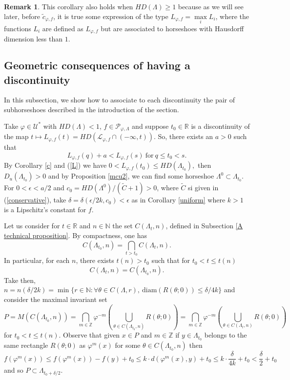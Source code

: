 \documentclass[12pt]{amsart}
\newcommand{\infinity}{\infty}
\theoremstyle{plain} %
\theoremstyle{definition} %
\newtheorem{remark}[theorem]{Remark}
\numberwithin{equation}{section}
\begin{document}
\begin{remark}\label{rr}
This corollary also holds when $HD(\Lambda)\geq 1$ because as we will see later, before $\tilde{c}_{\varphi,f}$, it is true some expression of the type $L_{\varphi, f}=\max\limits_{i}L_i$, where the functions $L_i$ are defined as $L_{\varphi, f}$ but are associated to horseshoes with Hausdorff dimension less than $1$.     
\end{remark}

\subsection{Geometric consequences of having a discontinuity}
In this subsection, we show how to associate to each discontinuity the pair of subhorseshoes described in the introduction of the section.

Take $\varphi \in \mathcal{U}^*$ with $HD(\Lambda)<1$, $f\in \mathcal{P}_{\varphi,\Lambda}$ and suppose $t_0\in \mathbb{R}$ is a discontinuity of the map  $t \mapsto L_{\varphi,f}(t)= HD(\mathcal{L}_{\varphi, f}\cap (-\infinity,t))$. So, there exists an $a>0$ such that
\begin{equation}\label{a-L}
L_{\varphi, f}(q)+a < L_{\varphi, f}(s) \ \mbox{for} \ q\leq t_0<s.    
\end{equation}
 By Corollary \ref{c} and (\ref{L}) we have $0<L_{\varphi, f}(t_0)\leq HD(\Lambda_{t_0}),$
then $D_u(\Lambda_{t_0})>0$ and by Proposition \ref{mcu2}, we can find some horseshoe $\Lambda^0 \subset \Lambda_{t_0}$.
For $0<\epsilon < a/2$ and $c_0=HD(\Lambda^0)/(\tilde{C}+1)>0$, where $\tilde{C}$ si given in (\ref{conservative}), take $\delta=\delta(\epsilon/2k, c_0) < \epsilon$ as in Corollary \ref{uniform} where $k>1$ is a Lipschitz's constant for $f$. 

Let us consider for $t\in \mathbb{R}$ and $n\in \mathbb{N}$ the set $C(\Lambda_t,n)$, defined in Subsection \ref{A technical proposition}. By compactness, one has 
$$C(\Lambda_{t_0},n)=\bigcap_{t> t_0} C(\Lambda_t,n).$$
In particular, for each $n$, there exists $t(n)>t_0$ such that for $t_0 < t \leq t(n)$
$$C(\Lambda_t,n)=C(\Lambda_{t_0},n).$$ 
Take then, $n=n(\delta/2k)=\min\{r\in\mathbb{N}:\forall \theta\in C(\Lambda,r), \  \text{diam}(R(\theta;0))\leq \delta/4k\}$ and consider the maximal invariant set 
$$P=M(C(\Lambda_{t_0},n))=\bigcap \limits_{m \in \mathbb{Z}} \varphi ^{-m}(\bigcup \limits_{\theta\in C(\Lambda_{t_0},n)}  R(\theta;0))=\bigcap \limits_{m \in \mathbb{Z}} \varphi ^{-m}(\bigcup \limits_{\theta\in C(\Lambda_t,n)}  R(\theta;0))$$
for $t_0 < t \leq t(n)$. Observe that given $x\in P$ and $m\in \mathbb{Z}$ if $y\in \Lambda_{t_0}$ belongs to the same rectangle $R(\theta;0)$ as $\varphi^m(x)$ for some $\theta\in C(\Lambda_{t_0},n)$ then
$$f(\varphi^m(x))\leq f(\varphi^m(x))-f(y)+t_0  \leq k\cdot d(\varphi^m(x),y)+t_0 \leq k\cdot \frac{\delta}{4k}+t_0 < \frac{\delta}{2} + t_0$$
and so $P \subset \Lambda_{t_0+\delta /2}$.
\end{document}
